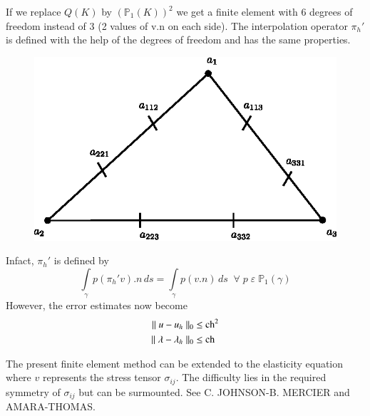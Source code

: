 \begin{REM}\label{chap7:rem8}
If we replace $Q(K)$ by $(\mathbb{P}_1(K))^2$ we get a finite element
with 6 degrees of freedom instead of 3 (2 values of v.n on each
side). The interpolation operator $\pi_h'$ is defined with the help of
the degrees of freedom and has the same properties.
\begin{figure}[H]
\centering
\includegraphics{figure/fig7.1.eps}
\caption{}\label{fig7.1}
\end{figure}

 In\pageoriginale fact, $\pi_h'$ is defined by 
$$
\int\limits_\gamma p(\pi_h'v).n\,ds=\int\limits_\gamma p(v.n)\,ds
\; \;\forall \;p\;\varepsilon\;\mathbb{P}_1(\gamma)
$$
However, the error estimates now become 
\begin{align*}
\parallel u-u_h\parallel_0 &\leq \operatorname{ch}^2\\
\parallel\lambda-\lambda_h\parallel_0 &\leq \operatorname{ch}
\end{align*}
\end{REM}

\begin{REM}\label{chap7:rem9}
The present finite element method can be extended to the elasticity
equation where $v$ represents the stress tensor $\sigma_{ij}$. The
difficulty lies in the required symmetry of $\sigma_{ij}$ but can be
surmounted. See C. JOHNSON-B. MERCIER \cite{key25} and
AMARA-THOMAS\cite{key2}. 
\end{REM}

